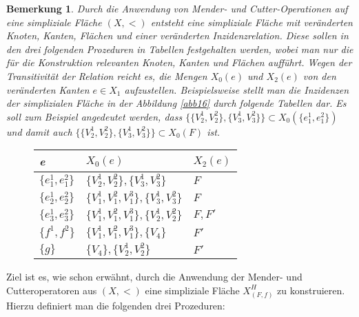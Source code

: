 \documentclass[12pt,titlepage,twoside,cleardoublepage]{article}
\theoremstyle{nummermitklammern}
\newtheorem{bemerkung}[temp]{Bemerkung}
\newtheorem{bemerkung}[zahl]{Bemerkung}
\numberwithin{equation}{section}
\begin{document}
\begin{bemerkung}
 Durch die Anwendung von Mender- und Cutter-Operationen auf eine simpliziale Fläche $(X,<)$ entsteht eine simpliziale Fläche mit veränderten Knoten, Kanten, Flächen und einer veränderten Inzidenzrelation. Diese sollen in den drei folgenden Prozeduren in Tabellen festgehalten werden, wobei man nur die für die Konstruktion relevanten Knoten, Kanten und Flächen aufführt.  Wegen der Transitivität der Relation reicht es, die Mengen $X_0(e)$ und $X_2(e)$ von den veränderten Kanten $e\in X_1$ aufzustellen.
Beispielsweise stellt man die Inzidenzen der simplizialen Fläche in der Abbildung \ref{abb16} durch folgende Tabellen dar. Es soll zum Beispiel angedeutet werden, dass $\{\{V_2^1,V_2^2\},\{V_3^1,V_3^2\}\}\subset X_0(\{e_1^1,e_1^2\})$ und damit auch $\{\{V_2^1,V_2^2\},\{V_3^1,V_3^2\}\}\subset X_0(F)$ ist.
\begin{figure}[H]
\begin{center}
\begin{tabularx}{\textwidth}{XXX}
\hline
\textbf{e}&\textbf{$X_0(e)$}&\textbf{$X_2(e)$}\\
 \hline
 $\{e_1^1,e_1^2\}$ & $\{V_2^1,V_2^2\},\{V_3^1,V_3^2\}$& $F$\\
  $\{e_2^1,e_2^2\}$&$\{V_1^1,V_1^2,V_1^3\},\{V_3^1,V_3^2\}$ & $F$\\
  $\{e_3^1,e_3^2\}$&$\{V_1^1,V_1^2,V_1^3\},\{V_2^1,V_2^2\}$ & $F,F'$\\ 
   $\{f^1,f^2\}$&$\{V_1^1,V_1^2,V_1^3\},\{V_4\}$& $F'$\\
   $\{g\}$ & $\{V_4\},\{V_2^1,V_2^2\}$ & $F'$ \\

   
 \end{tabularx}
\end{center}
\end{figure}

\end{bemerkung}
Ziel ist es, wie schon erwähnt, durch die Anwendung der Mender- und Cutteroperatoren aus $(X,<)$ eine simpliziale Fläche $X^H_{(F,f)}$ zu konstruieren. 
Hierzu definiert man die folgenden drei Prozeduren:
\end{document}
